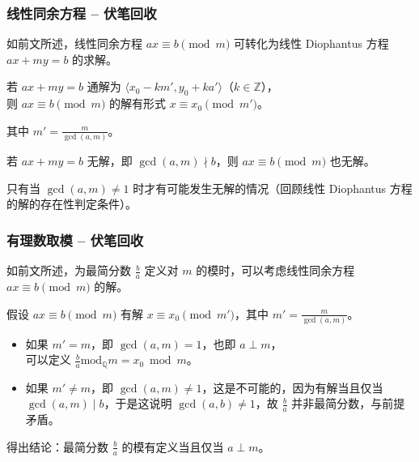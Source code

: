 \documentclass{../pkslide}
\begin{document}
\begin{frame}
  \frametitle{线性同余方程 -- 伏笔回收}
  如前文所述，线性同余方程 $a x \equiv b \pmod{m}$ 可转化为线性 Diophantus 方程 $a x + m y = b$ 的求解。
  
  \emptyline
  
  若 $a x + m y = b$ 通解为 $\langle x_0 - k m', y_0 + k a' \rangle$（$k \in \mathbb Z$），\\
  则 $a x \equiv b \pmod{m}$ 的解有形式 $x \equiv x_0 \pmod{m'}$。
  
  其中 $m' = \frac{m}{\gcd(a, m)}$。
  
  \emptyline
  
  若 $a x + m y = b$ 无解，即 $\gcd(a, m) \nmid b$，则 $a x \equiv b \pmod{m}$ 也无解。
  
  只有当 $\gcd(a, m) \ne 1$ 时才有可能发生无解的情况（回顾线性 Diophantus 方程的解的存在性判定条件）。
\end{frame}

\begin{frame}
  \frametitle{有理数取模 -- 伏笔回收}
  如前文所述，为最简分数 $\frac{b}{a}$ 定义对 $m$ 的模时，可以考虑线性同余方程 $a x \equiv b \pmod{m}$ 的解。
  
  \emptyline
  
  假设 $a x \equiv b \pmod{m}$ 有解 $x \equiv x_0 \pmod{m'}$，其中 $m' = \frac{m}{\gcd(a, m)}$。
  
  \begin{itemize}
    \item 如果 $m' = m$，即 $\gcd(a, m) = 1$，也即 $a \perp m$，\\
      \-\hspace{2em}可以定义 $\frac{b}{a} \mathbin{\mathrm{mod}_{\mathbb Q}} m = x_0 \bmod m$。
    \item 如果 $m' \ne m$，即 $\gcd(a, m) \ne 1$，这是不可能的，因为有解当且仅当 $\gcd(a, m) \mid b$，于是这说明 $\gcd(a, b) \ne 1$，故 $\frac{b}{a}$ 并非最简分数，与前提矛盾。
  \end{itemize}
  
  \emptyline
  
  得出结论：最简分数 $\frac{b}{a}$ 的模有定义当且仅当 $a \perp m$。
\end{frame}
\end{document}
